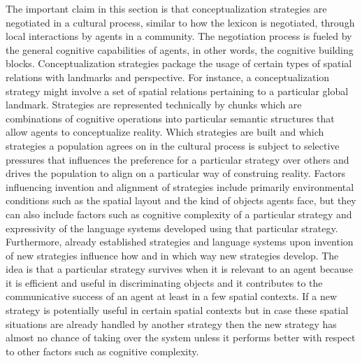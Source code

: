 The important claim in this section is that conceptualization strategies 
are negotiated in a cultural process, similar to how the lexicon is negotiated, through local
interactions by agents in a community. The negotiation process is fueled by the 
general cognitive capabilities of agents, in other
words, the cognitive building blocks. Conceptualization strategies package the usage of
certain types of spatial relations with landmarks and perspective. For instance, a conceptualization
strategy might involve a set of spatial relations pertaining to a particular global landmark.
Strategies are represented technically by chunks which are combinations of cognitive operations 
into particular semantic structures that allow agents to conceptualize reality. 
Which strategies are built and which strategies a 
population agrees on in the cultural process is subject to selective pressures that 
influences the preference for a particular strategy over others and drives the 
population to align on a particular way of construing reality. Factors influencing 
invention and alignment of strategies include primarily environmental conditions such 
as the spatial layout and the kind of objects agents face, but they can also include 
factors such as cognitive complexity of a particular strategy and expressivity
of the language systems developed using that particular strategy. Furthermore,
already established strategies and language systems upon invention
of new strategies influence how and in which way new strategies develop.
The idea is that a particular strategy survives when it is relevant to an agent because
it is efficient and useful in discriminating objects and it contributes to the communicative success of
an agent at least in a few spatial contexts. If a new strategy is potentially useful in certain
spatial contexts but in case these spatial situations are already handled by another strategy then
the new strategy has almost no chance of taking over the system unless it performs 
better with respect to other factors such as cognitive complexity. 

